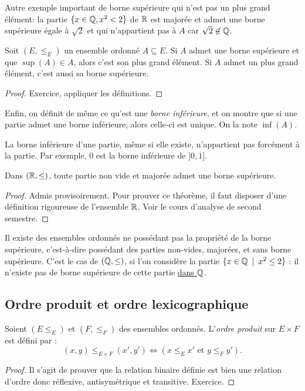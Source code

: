 Autre exemple important de borne supérieure qui n'est pas un plus grand élément: la partie $\{x\in \mathbb{Q}, x^2<2\}$ de $\mathbb{R}$ est majorée et admet une borne supérieure égale à $\sqrt 2$ et qui n'appartient pas à $A$ car $\sqrt2\not\in \mathbb{Q}$. 

\begin{proposition}
Soit $(E,\leq_E)$ un ensemble ordonné $A\subseteq E$.
Si $A$ admet une borne supérieure et que $\sup(A) \in A$, alors c'est son plus grand élément.
Si $A$ admet un plus grand élément, c'est aussi sa borne supérieure.
\end{proposition}
\begin{proof}
Exercice, appliquer les définitions.
\end{proof}

Enfin, on définit de même ce qu'est une \emph{borne inférieure}, et on montre que si une partie admet une borne inférieure, alors celle-ci est unique. On la note $\inf(A)$. 

La borne inférieure d'une partie, même si elle existe, n'appartient pas forcément à la partie. Par exemple, $0$ est la borne inférieure de $]0,1]$.

\begin{theoreme}
Dans $(\mathbb{R},\leq)$, toute partie non vide et majorée admet une borne supérieure.
\end{theoreme}
\begin{proof}
Admis provisoirement. Pour prouver ce théorème, il faut disposer d'une définition rigoureuse de l'ensemble $\mathbb{R}$. Voir le cours d'analyse de second semestre.
\end{proof}

Il existe des ensembles ordonnés ne possédant pas la propriété de la borne supérieure, c'est-à-dire possédant des parties non-vides, majorées, et sans borne supérieure. C'est le cas de $(\mathbb{Q},\leq)$, si l'on considère la partie $\{x\in \mathbb{Q}\:\mid\: x^2\leq 2\}$ : il n'existe pas de borne supérieure de cette partie \underline{dans $\mathbb{Q}$}.


\subsection{Ordre produit et ordre lexicographique}

\begin{propdef}
Soient $(E\leq_E)$ et $(F,\leq_F)$ des ensembles ordonnés.
L'\emph{ordre produit} sur $E\times F$ est défini par :
\[
(x,y) \leq_{E\times F} (x',y') \iff \left(x\leq_E x' \text{ et } y\leq_F y'\right).
\]
\end{propdef}
\begin{proof}
Il s'agit de prouver que la relation binaire définie est bien une relation d'ordre donc réflexive, antisymétrique et transitive. Exercice.
\end{proof}

